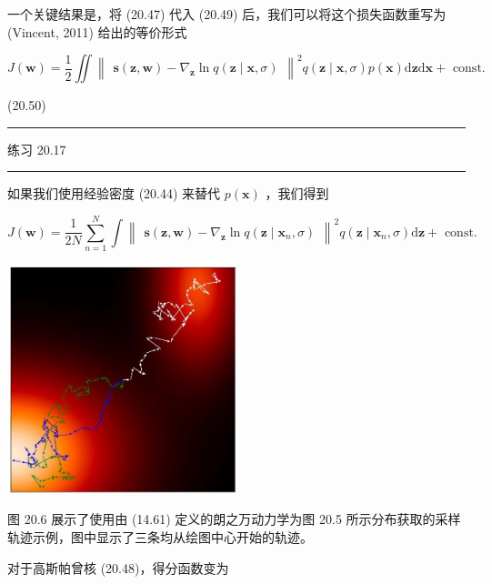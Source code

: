 \documentclass[10pt]{article}
\newcommand{\HRule}{\begin{center}\rule{0.9\linewidth}{0.2mm}\end{center}}
\begin{document}
一个关键结果是，将 (20.47) 代入 (20.49) 后，我们可以将这个损失函数重写为 (Vincent, 2011) 给出的等价形式

\[
J\left( \mathbf{w}\right)  = \frac{1}{2}\iint {\begin{Vmatrix}\mathbf{s}\left( \mathbf{z},\mathbf{w}\right)  - {\nabla }_{\mathbf{z}}\ln q\left( \mathbf{z} \mid  \mathbf{x},\sigma \right) \end{Vmatrix}}^{2}q\left( {\mathbf{z} \mid  \mathbf{x},\sigma }\right) p\left( \mathbf{x}\right) \mathrm{d}\mathbf{z}\mathrm{d}\mathbf{x} + \text{ const. }
\]

(20.50)

\HRule

练习 20.17

\HRule

如果我们使用经验密度 (20.44) 来替代 \(p\left( \mathbf{x}\right)\) ，我们得到

\[
J\left( \mathbf{w}\right)  = \frac{1}{2N}\mathop{\sum }\limits_{{n = 1}}^{N}\int {\begin{Vmatrix}\mathbf{s}\left( \mathbf{z},\mathbf{w}\right)  - {\nabla }_{\mathbf{z}}\ln q\left( \mathbf{z} \mid  {\mathbf{x}}_{n},\sigma \right) \end{Vmatrix}}^{2}q\left( {\mathbf{z} \mid  {\mathbf{x}}_{n},\sigma }\right) \mathrm{d}\mathbf{z} + \text{ const. } \tag{20.51}
\]

\begin{center}
\includegraphics[max width=0.5\textwidth]{images/0194e279-9b28-703a-88f4-c3ac21e2010d_616_925_348_623_625_0.jpg}
\end{center}
\hspace*{3em} 

图 20.6 展示了使用由 (14.61) 定义的朗之万动力学为图 20.5 所示分布获取的采样轨迹示例，图中显示了三条均从绘图中心开始的轨迹。

对于高斯帕曾核 (20.48)，得分函数变为
\end{document}
